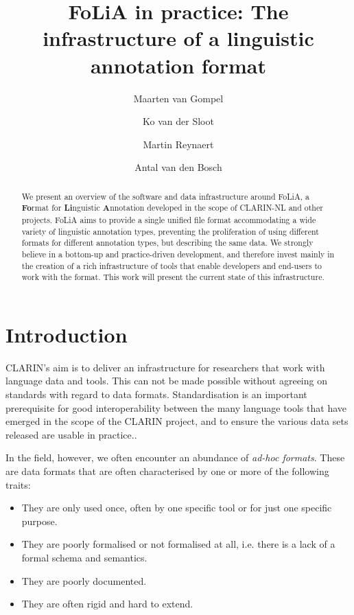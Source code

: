 \documentclass[a4paper,10pt,twoside]{article}
\begin{document}
\title{FoLiA in practice: The infrastructure of a linguistic annotation format}
\author{Maarten van Gompel \and Ko van der Sloot \and Martin Reynaert \and Antal van den Bosch}
\date{}

\maketitle

\begin{abstract}
We present an overview of the software and data infrastructure around FoLiA, a
\textbf{Fo}rmat for \textbf{Li}nguistic \textbf{A}nnotation developed in the
scope of CLARIN-NL and other projects.  FoLiA aims to provide a single unified
file format accommodating a wide variety of linguistic annotation types,
preventing the proliferation of using different formats for different
annotation types, but describing the same data. We strongly believe in a
bottom-up and practice-driven development, and therefore invest mainly in the
creation of a rich infrastructure of tools that enable developers and end-users
to work with the format. This work will present the current state of this
infrastructure.
\end{abstract}


\section{Introduction}

CLARIN's aim is to deliver an infrastructure for researchers that work with
language data and tools. This can not be made possible without agreeing on standards
with regard to data formats. Standardisation is an important prerequisite for
good interoperability between the many language tools that have emerged in the scope
of the CLARIN project, and to ensure the various data sets released are usable
in practice..

In the field, however, we often encounter an abundance of \emph{ad-hoc formats}. These are
data formats that are often characterised by one or more of the following traits:

\begin{itemize}
    \item They are only used once, often by one specific tool or for just one specific purpose.
    \item They are poorly formalised or not formalised at all, i.e. there is a lack of a formal schema and semantics.
    \item They are poorly documented.
    \item They are often rigid and hard to extend.
\end{itemize}
\end{document}
